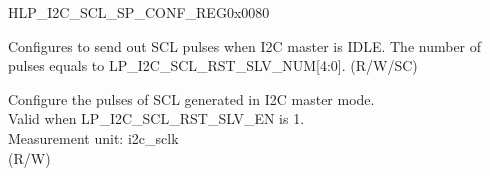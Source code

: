 \begin{register}{H}{LP\_I2C\_SCL\_SP\_CONF\_REG}{0x0080}\label{regdesc:LPI2CSCLSPCONFREG}
%
%
%
%
%
\regnewline%
\begin{regdesc}\begin{reglist}
\label{fielddesc:LPI2CSCLRSTSLVEN}\item [LP\_I2C\_SCL\_RST\_SLV\_EN] Configures to send out SCL pulses when I2C master is IDLE. The number of pulses equals to LP\_I2C\_SCL\_RST\_SLV\_NUM[4:0]. (R/W/SC)
\label{fielddesc:LPI2CSCLRSTSLVNUM}\item [LP\_I2C\_SCL\_RST\_SLV\_NUM] Configure the pulses of SCL generated in I2C master mode. \\
Valid when LP\_I2C\_SCL\_RST\_SLV\_EN is 1.\\
Measurement unit: i2c\_sclk \\ (R/W)
\end{reglist}\end{regdesc}
\end{register}


